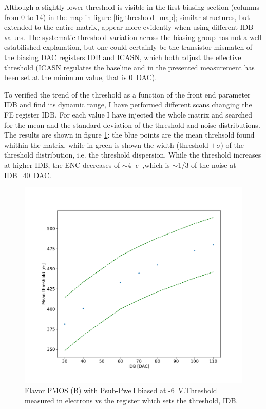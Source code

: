         Although a slightly lower threshold is visible in the first biasing section (columns from 0 to 14) in the map in figure \ref{fig:threshold_map}; similar structures, but extended to the entire matrix, appear more evidently when using different IDB values. 
        The systematic threshold variation across the biasing group has not a well estabilished explanation, but one could certainly be the transistor mismatch of the biasing DAC registers IDB and ICASN, which both adjust the effective threshold (ICASN regulates the baseline and in the presented measurement has been set at the minimum value, that is \SI{0}{DAC}).

        To verified the trend of the threshold as a function of the front end parameter IDB and find its dynamic range, I have performed different scans changing the FE register IDB. For each value I have injected the whole matrix and searched for the mean and the standard deviation of the threshold and noise distributions. The results are shown in figure \ref{fig:threshold_vs_IDB}: the blue points are the mean threhsold found whithin the matrix, while in green is shown the width (threshold $\pm \sigma$) of the threshold distribution, i.e. the threshold dispersion. 
        While the threshold increases at higher IDB, the ENC decreases of $\sim$\SI{4}{\elementarycharge}$^-$,which is $\sim$1/3 of the noise at IDB=\SI{40}{DAC}. 
        \begin{figure}[h!]
            \centering
            \includegraphics[width=.70\linewidth]{figures/charaterization/thr_vs_IDB.pdf}
            \caption{Flavor PMOS (B) with Psub-Pwell biased at -\SI{6}{V}.Threshold measured in electrons vs the register which sets the threshold, IDB.  }
            \label{fig:threshold_vs_IDB}
        \end{figure}            

